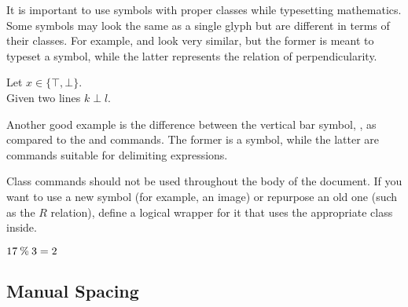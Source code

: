 It is important to use symbols with proper classes while typesetting
mathematics. Some symbols may look the same as a single glyph but are different
in terms of their classes. For example,  and  look very
similar, but the former is meant to typeset a symbol, while the latter
represents the relation of perpendicularity.
\begin{example}
Let \(x \in \{\top, \bot\}\).
\\ %
Given two lines \(k \perp l\).
\end{example}
Another good example is the difference between the vertical bar symbol, \ai{|},
as compared to the  and  commands. The former is a symbol,
while the latter are commands suitable for delimiting expressions.

Class commands should not be used throughout the body of the document. If
you want to use a new symbol (for example, an image) or repurpose an old one (such
as the \(R\) relation), define a logical wrapper for it that uses the
appropriate class inside.
\begin{example}
\NewDocumentCommand{\modulo}{}{%
  \mathbin{\%}%
}
\( 17 \modulo 3 = 2 \)
\end{example}

\subsection{Manual Spacing}\label{sec:math_spacing}

